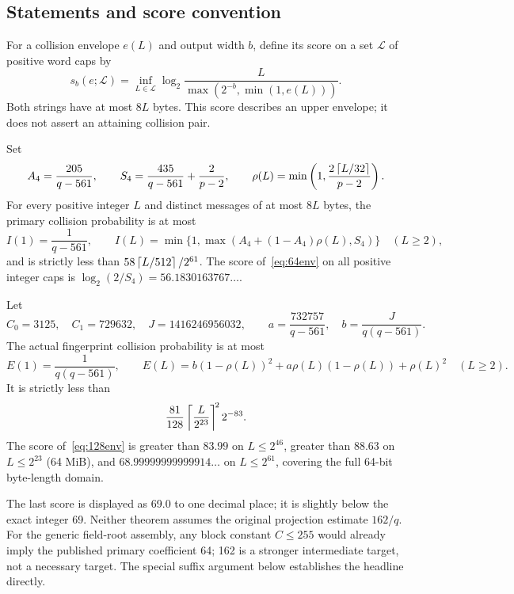 \subsection{Statements and score convention}
For a collision envelope $e(L)$ and output width $b$, define its score on a set $\mathcal L$ of positive word caps by
\begin{equation}\label{eq:score}
 s_b(e;\mathcal L)=\inf_{L\in\mathcal L}\log_2\frac{L}{\max(2^{-b},\min(1,e(L)))}.
\end{equation}
Both strings have at most $8L$ bytes. This score describes an upper envelope; it does not assert an attaining collision pair.

\begin{theorem}\label{thm:64}
Set
\[
 A_4=\frac{205}{q-561},\qquad S_4=\frac{435}{q-561}+\frac2{p-2},\qquad
 \rho(L)=\min\left(1,\frac{2\left\lceil L/32\right\rceil}{p-2}\right).
\]
For every positive integer $L$ and distinct messages of at most $8L$ bytes, the primary collision probability is at most
\begin{equation}\label{eq:64env}
 I(1)=\frac1{q-561},\qquad
 I(L)=\min\{1,\max(A_4+(1-A_4)\rho(L),S_4)\}\quad(L\ge2),
\end{equation}
and is strictly less than $58\left\lceil L/512\right\rceil/2^{61}$. The score of~\eqref{eq:64env} on all positive integer caps is $\log_2(2/S_4)=56.1830163767\ldots$.
\end{theorem}

\begin{theorem}\label{thm:128}
Let
\[
 C_0=3125,\quad C_1=729632,\quad J=1416246956032,
 \qquad a=\frac{732757}{q-561},\quad b=\frac{J}{q(q-561)}.
\]
The actual fingerprint collision probability is at most
\begin{equation}\label{eq:128env}
 E(1)=\frac1{q(q-561)},\qquad
 E(L)=b(1-\rho(L))^2+a\rho(L)(1-\rho(L))+\rho(L)^2\quad(L\ge2).
\end{equation}
It is strictly less than
\begin{equation}\label{eq:128coarse}
 \frac{81}{128}\left\lceil\frac{L}{2^{23}}\right\rceil^{\!2}2^{-83}.
\end{equation}
The score of~\eqref{eq:128env} is greater than $83.99$ on $L\le2^{46}$, greater than $88.63$ on $L\le2^{23}$ (64 MiB), and $68.99999999999914\ldots$ on $L\le2^{61}$, covering the full 64-bit byte-length domain.
\end{theorem}
The last score is displayed as 69.0 to one decimal place; it is slightly below the exact integer 69. Neither theorem assumes the original projection estimate $162/q$. For the generic field-root assembly, any block constant $C\le255$ would already imply the published primary coefficient 64; 162 is a stronger intermediate target, not a necessary target. The special suffix argument below establishes the headline directly.

